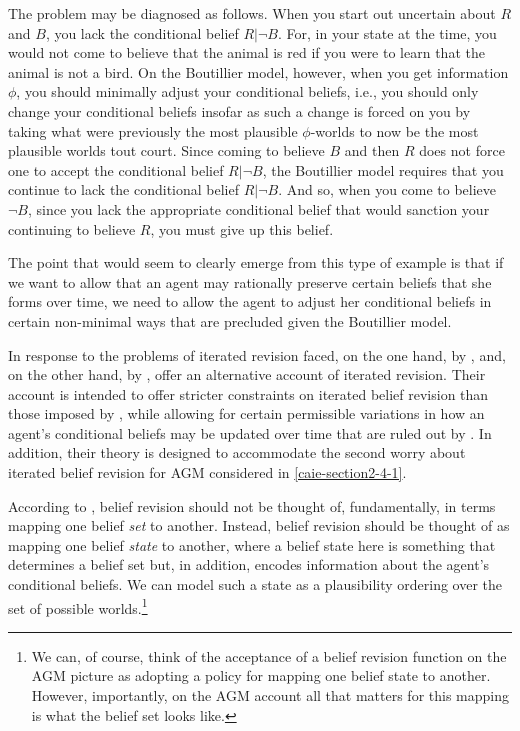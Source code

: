 The problem may be diagnosed as follows.
When you start out uncertain about $R$ and $B$, you lack the conditional belief $R | \lnot B$.
For, in your state at the time, you would not come to believe that the animal is red if you were to learn that the animal is not a bird.
On the Boutillier model, however, when you get information $\phi$, you should minimally adjust your conditional beliefs, i.e., you should only change your conditional beliefs insofar as such a change is forced on you by taking what were previously the most plausible $\phi$-worlds to now be the most plausible worlds tout court.
Since coming to believe $B$  and then $R$ does not force one to accept the conditional belief $R | \lnot B$, the Boutillier model requires that you continue to lack the conditional belief $R | \lnot B$.
And so, when you come to believe $\lnot B$, since you lack the appropriate conditional belief that would sanction your continuing to believe $R$, you must give up this belief.

The point that would seem to clearly emerge from this type of example is that if we want to allow that an agent may rationally preserve certain beliefs that she forms over time, we need to allow the agent to adjust her conditional beliefs in certain non-minimal ways that are precluded given the Boutillier model.

In response to the problems of iterated revision faced, on the one hand, by \citet{AGM}, and, on the other hand, by \citet{Boutilier1}, \citet{DarwichePearle} offer an alternative account of iterated revision.
Their account is intended to offer stricter constraints on iterated belief revision than those imposed by \citet{AGM}, while allowing for certain permissible variations in how an agent's conditional beliefs may be updated over time that are ruled out by \citet{Boutilier1}.
In addition, their theory is designed to accommodate the second worry about iterated belief revision for AGM considered in \autoref{caie-section2-4-1}.

According to \citet{DarwichePearle}, belief revision should not be thought of, fundamentally, in terms  mapping one belief \textit{set} to another.
Instead, belief revision should be thought of as mapping one belief \textit{state} to another, where a belief state here is something that determines a belief set but, in addition, encodes information about the agent's conditional beliefs.
We can model such a state as a plausibility ordering over the set of possible worlds.\footnote{We can, of course, think of the acceptance of a belief revision function on the AGM picture as adopting a policy for mapping one belief state to another. However, importantly, on the AGM account all that matters for this mapping is what the belief set looks like.}

